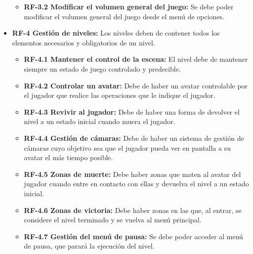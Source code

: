 \begin{itemize}
\begin{itemize}
\item
\textbf{RF-3.2 Modificar el volumen general del juego:} Se debe poder modificar el volumen general del juego desde el menú de opciones.
\end{itemize}

\item
\textbf{RF-4 Gestión de niveles:} Los niveles deben de contener todos los elementos necesarios y obligatorios de un nivel.

\begin{itemize}
\item
\textbf{RF-4.1 Mantener el control de la escena:} El nivel debe de mantener siempre un estado de juego controlado y predecible.
\end{itemize}

\begin{itemize}
\item
\textbf{RF-4.2 Controlar un avatar:} Debe de haber un avatar controlable por el jugador que realice las operaciones que le indique el jugador.
\end{itemize}

\begin{itemize}
\item
\textbf{RF-4.3 Revivir al jugador:} Debe de haber una forma de devolver el nivel a un estado inicial cuando muera el jugador.
\end{itemize}

\begin{itemize}
\item
\textbf{RF-4.4 Gestión de cámaras:} Debe de haber un sistema de gestión de cámaras cuyo objetivo sea que el jugador pueda ver en pantalla a su avatar el más tiempo posible.
\end{itemize}

\begin{itemize}
\item
\textbf{RF-4.5 Zonas de muerte:} Debe haber zonas que maten al avatar del jugador cuando entre en contacto con ellas y devuelva el nivel a un estado inicial.
\end{itemize}

\begin{itemize}
\item
\textbf{RF-4.6 Zonas de victoria:} Debe haber zonas en las que, al entrar, se considere el nivel terminado y se vuelva al menú principal.
\end{itemize}

\begin{itemize}
\item
\textbf{RF-4.7 Gestión del menú de pausa:} Se debe poder acceder al menú de pausa, que parará la ejecución del nivel.


\end{itemize}
\end{itemize}
